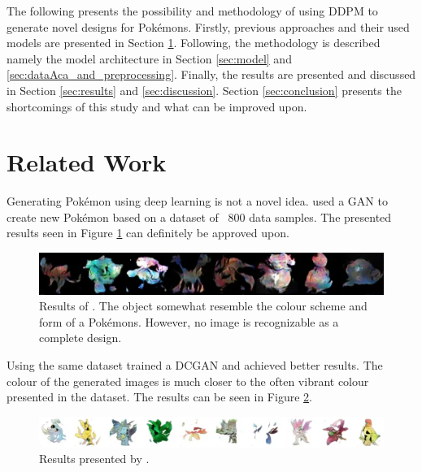 \documentclass[12pt]{article}
\theoremstyle{plain}
\theoremstyle{definition}
\theoremstyle{remark}
\begin{document}
The following presents the possibility and methodology of using \ac{DDPM} to generate novel designs for Pokémons. Firstly, previous approaches and their used models are presented in Section \ref{sec:relwork}. Following, the methodology is described namely the model architecture in Section \ref{sec:model} and \ref{sec:dataAca_and_preprocessing}. Finally, the results are presented and discussed in Section \ref{sec:results} and \ref{sec:discussion}. Section \ref{sec:conclusion} presents the shortcomings of this study and what can be improved upon. 
%
%
\section{Related Work}
\label{sec:relwork}
Generating Pokémon using deep learning is not a novel idea. \cite{Kleiber2020} used a \ac{GAN} to create new Pokémon based on a dataset of ~800 data samples. The presented results seen in Figure \ref{fig:kleiberresults} can definitely be approved upon.\\
 

 \begin{figure}[h]
	\centering
	\includegraphics[width=1\linewidth]{src/Images/Kleiber_results}
	\caption[Results of \cite{Kleiber2020}]{Results of \cite{Kleiber2020}. The object somewhat resemble the colour scheme and form of a Pokémons. However, no image is recognizable as a complete design.}
	\label{fig:kleiberresults}
\end{figure}

Using the same dataset \cite{Chambel2022} trained a \ac{DCGAN} and achieved better results. The colour of the generated images is much closer to the often vibrant colour presented in the dataset. The results can be seen in Figure \ref{fig:chambelresults}.

\begin{figure}[h]
	\centering
	\includegraphics[width=1\linewidth]{src/Images/Chambel_results}
	\caption[Results presented by \cite{Chambel2022}]{Results presented by \cite{Chambel2022}.}
	\label{fig:chambelresults}
\end{figure}
\end{document}
